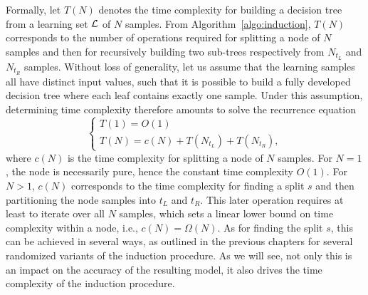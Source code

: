 Formally, let $T(N)$ denotes the time complexity for building a decision tree from a
learning set ${\cal L}$ of $N$ samples. From Algorithm~\ref{algo:induction},
$T(N)$ corresponds to the number of operations required for splitting a node of $N$ samples and then for recursively
building two sub-trees respectively from $N_{t_L}$ and $N_{t_R}$ samples. Without
loss of generality, let us assume that the learning samples all have distinct
input values, such that it is possible to build a fully developed decision tree
where each leaf contains exactly one sample. Under this assumption, determining
time complexity therefore amounts to solve the recurrence equation
\begin{equation}
\begin{cases}
T(1) = O(1) \\
T(N) = c(N) + T(N_{t_L}) + T(N_{t_R}),
\end{cases}
\end{equation}
where $c(N)$ is the time complexity for splitting a node of $N$ samples. For
$N=1$, the node is necessarily pure, hence the constant time complexity $O(1)$.
For $N>1$, $c(N)$ corresponds to the time complexity for finding a split $s$
and then partitioning the node samples into ${t_L}$ and ${t_R}$. This later
operation requires at least to iterate over all $N$ samples, which sets a
linear lower bound on time complexity within a node, i.e., $c(N)=\Omega(N)$. As
for finding the split $s$, this can be achieved in several ways, as outlined in
the previous chapters  for several randomized variants of the induction
procedure. As we will see, not only this is an impact on the accuracy of the
resulting model, it also drives the time complexity of the induction procedure.

